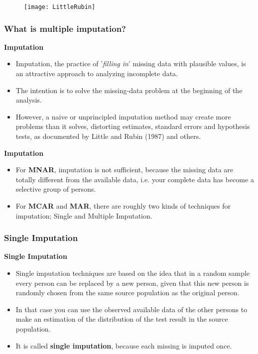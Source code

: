 \documentclass[MASTER.tex]{subfiles}
\begin{document}
 
\begin{frame}
	\begin{figure}
		\centering
		\texttt{[image: LittleRubin]}
	\end{figure}
	
\end{frame}
\begin{frame}
	\frametitle{What is multiple imputation?}
	\Large
\noindent \textbf{Imputation}
\begin{itemize}
\item 	Imputation, the practice of '\textit{filling in}' missing data with plausible values, is an attractive approach to analyzing incomplete data. 
\item The intention is to solve the missing-data problem at the beginning of the analysis.
\item However, a naive or unprincipled imputation method may create more problems than it solves, distorting estimates, standard errors and hypothesis tests, as documented by Little and Rubin (1987) and others.
\end{itemize}
\end{frame}
\begin{frame}
	\Large
	\noindent \textbf{Imputation}
	\begin{itemize}
\item For \textbf{MNAR}, imputation is not sufficient, because the missing data are totally different from the
available data, i.e. your complete data has become a selective group of persons. 
\item For \textbf{MCAR} and \textbf{MAR}, there are roughly two kinds of techniques for imputation; Single and Multiple
Imputation.
	\end{itemize}


\end{frame}
\begin{frame}
	\frametitle{Single Imputation}
	\Large
\noindent \textbf{Single Imputation}
\begin{itemize}
\item Single imputation techniques are based on the idea that in a random sample every person can be
replaced by a new person, given that this new person is randomly chosen from the same source
population as the original person. 
\item In that case you can use the observed available data of the
other persons to make an estimation of the distribution of the test result in the source population.
\item It is called \textbf{single imputation}, because each missing is imputed once.
\end{itemize}

\end{frame}
\end{document}
